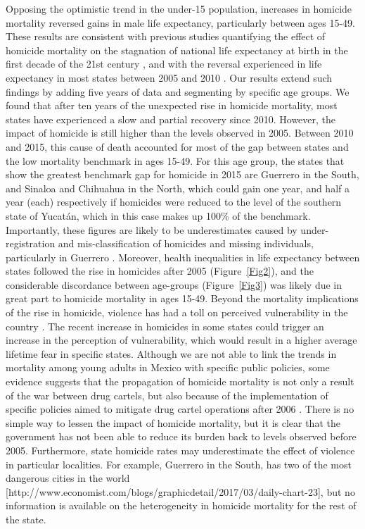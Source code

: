 \documentclass{bmcart}
\begin{document}
Opposing the optimistic trend in the under-15 population, increases in homicide mortality reversed gains in male life expectancy, particularly between ages 15-49. These results are consistent with previous studies quantifying the effect of homicide mortality on the stagnation of national life expectancy at birth in the first decade of the 21st century \cite{canudas2014}, and with the reversal experienced in life expectancy in most states between 2005 and 2010 \cite{Aburto2015}. Our results extend such findings by adding five years of data and segmenting by specific age groups. We found that after ten years of the unexpected rise in homicide mortality, most states have experienced a slow and partial recovery since 2010. However, the impact of homicide is still higher than the levels observed in 2005. Between 2010 and 2015, this cause of death accounted for most of the gap between states and the low mortality benchmark in ages 15-49. For this age group, the states that show the greatest benchmark gap for homicide in 2015 are Guerrero in the South, and Sinaloa and Chihuahua in the North, which could gain one year, and half a year (each) respectively if homicides were reduced to the level of the southern state of Yucat\'an, which in this case makes up 100\% of the benchmark. Importantly, these figures are likely to be underestimates caused by under-registration and mis-classification of homicides and missing individuals, particularly in Guerrero \cite{HRW2011,wright2017epistemological}. Moreover, health inequalities in life expectancy between states followed the rise in homicides after 2005 (Figure~\ref{Fig2}), and the considerable discordance between age-groups (Figure~\ref{Fig3}) was likely due in great part to homicide mortality in ages 15-49.
Beyond the mortality implications of the rise in homicide, violence has had a toll on perceived vulnerability in the country \cite{canudas2017Mexico}. The recent increase in homicides in some states could trigger an increase in the perception of vulnerability, which would result in a higher average lifetime fear in specific states. Although we are not able to link the trends in mortality among young adults in Mexico with specific public policies, some evidence suggests that the propagation of homicide mortality is not only a result of the war between drug cartels, but also because of the implementation of specific policies aimed to mitigate drug cartel operations after 2006 \cite{espinal2015analysis}.
There is no simple way to lessen the impact of homicide mortality, but it is clear that the government has not been able to reduce its burden back to levels observed before 2005. Furthermore, state homicide rates may underestimate the effect of violence in particular localities. For example, Guerrero in the South, has two of the most dangerous cities in the world [http://www.economist.com/blogs/graphicdetail/2017/03/daily-chart-23], but no information is available on the heterogeneity in homicide mortality for the rest of the state.
\end{document}
